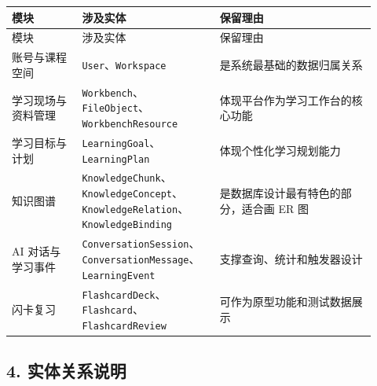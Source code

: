\documentclass[10pt,a4paper,fontset=none]{ctexart}
\begin{document}
\begingroup\scriptsize
\renewcommand{\arraystretch}{1.18}
\setlength{\LTleft}{0pt}
\setlength{\LTright}{0pt}
\begin{longtable}{>{\raggedright\arraybackslash}p{0.18\linewidth}>{\raggedright\arraybackslash}p{0.34\linewidth}>{\raggedright\arraybackslash}p{0.40\linewidth}}
\toprule
模块 & 涉及实体 & 保留理由 \\
\midrule
\endfirsthead
\toprule
模块 & 涉及实体 & 保留理由 \\
\midrule
\endhead
账号与课程空间 & \texttt{User}、\texttt{Workspace} & 是系统最基础的数据归属关系 \\
学习现场与资料管理 & \texttt{Workbench}、\texttt{FileObject}、\texttt{WorkbenchResource} & 体现平台作为学习工作台的核心功能 \\
学习目标与计划 & \texttt{LearningGoal}、\texttt{LearningPlan} & 体现个性化学习规划能力 \\
知识图谱 & \texttt{KnowledgeChunk}、\texttt{KnowledgeConcept}、\texttt{KnowledgeRelation}、\texttt{KnowledgeBinding} & 是数据库设计最有特色的部分，适合画 ER 图 \\
AI 对话与学习事件 & \texttt{ConversationSession}、\texttt{ConversationMessage}、\texttt{LearningEvent} & 支撑查询、统计和触发器设计 \\
闪卡复习 & \texttt{FlashcardDeck}、\texttt{Flashcard}、\texttt{FlashcardReview} & 可作为原型功能和测试数据展示 \\
\bottomrule
\end{longtable}
\endgroup


\subsection*{4. 实体关系说明}
\end{document}
